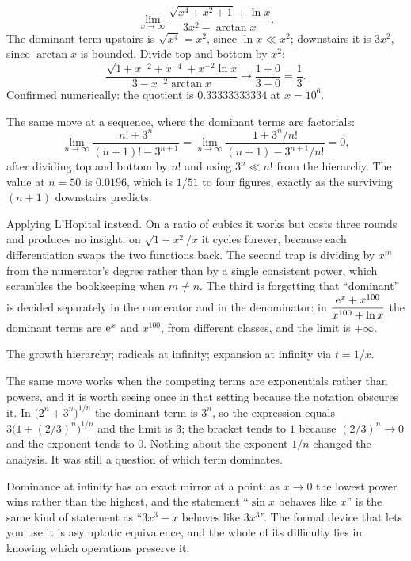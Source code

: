 \begin{worked}
\[
\lim_{x\to\infty}\frac{\sqrt{x^{4}+x^{2}+1}+\ln x}{3x^{2}-\arctan x}.
\]
The dominant term upstairs is $\sqrt{x^{4}}=x^{2}$, since $\ln x\ll x^{2}$; downstairs it is $3x^{2}$, since $\arctan x$ is bounded. Divide top and bottom by $x^{2}$:
\[
\frac{\sqrt{1+x^{-2}+x^{-4}}+x^{-2}\ln x}{3-x^{-2}\arctan x}\longrightarrow\frac{1+0}{3-0}=\frac13 .
\]
Confirmed numerically: the quotient is $0.33333333334$ at $x=10^{6}$.

The same move at a sequence, where the dominant terms are factorials:
\[
\lim_{n\to\infty}\frac{n!+3^{n}}{(n+1)!-3^{n+1}}
=\lim_{n\to\infty}\frac{1+3^{n}/n!}{(n+1)-3^{n+1}/n!}=0 ,
\]
after dividing top and bottom by $n!$ and using $3^{n}\ll n!$ from the hierarchy. The value at $n=50$ is $0.0196$, which is $1/51$ to four figures, exactly as the surviving $(n+1)$ downstairs predicts.
\end{worked}

\begin{trap}
Applying L'Hopital instead. On a ratio of cubics it works but costs three rounds and produces no insight; on $\sqrt{1+x^{2}}/x$ it cycles forever, because each differentiation swaps the two functions back. The second trap is dividing by $x^{m}$ from the numerator's degree rather than by a single consistent power, which scrambles the bookkeeping when $m\neq n$. The third is forgetting that ``dominant'' is decided separately in the numerator and in the denominator: in $\dfrac{\mathrm{e}^{x}+x^{100}}{x^{100}+\ln x}$ the dominant terms are $\mathrm{e}^{x}$ and $x^{100}$, from different classes, and the limit is $+\infty$.
\end{trap}

\begin{seealsob}The growth hierarchy; radicals at infinity; expansion at infinity via $t=1/x$.\end{seealsob}

The same move works when the competing terms are exponentials rather than powers, and it is worth seeing once in that setting because the notation obscures it. In $\bigl(2^{n}+3^{n}\bigr)^{1/n}$ the dominant term is $3^{n}$, so the expression equals $3\bigl(1+(2/3)^{n}\bigr)^{1/n}$ and the limit is $3$; the bracket tends to $1$ because $(2/3)^{n}\to0$ and the exponent tends to $0$. Nothing about the exponent $1/n$ changed the analysis. It was still a question of which term dominates.

Dominance at infinity has an exact mirror at a point: as $x\to0$ the lowest power wins rather than the highest, and the statement ``$\sin x$ behaves like $x$'' is the same kind of statement as ``$3x^{3}-x$ behaves like $3x^{3}$''. The formal device that lets you use it is asymptotic equivalence, and the whole of its difficulty lies in knowing which operations preserve it.

